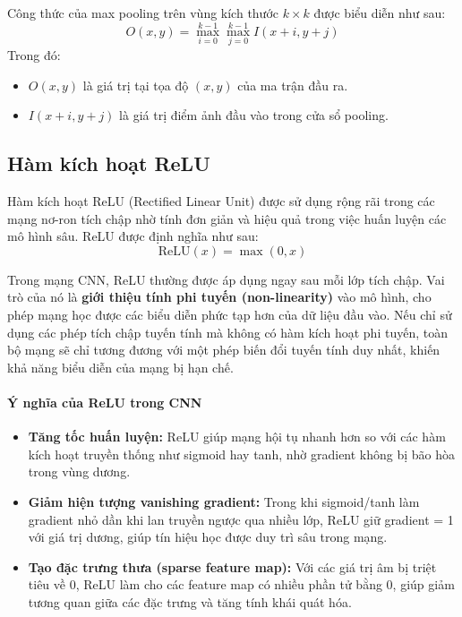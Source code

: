 Công thức của max pooling trên vùng kích thước \( k \times k \) được biểu diễn như sau:\\
\[
O(x, y) = \max_{i=0}^{k-1} \max_{j=0}^{k-1} I(x+i, y+j)
\]
Trong đó:
\begin{itemize}
    \item $O(x, y)$ là giá trị tại tọa độ $(x, y)$ của ma trận đầu ra.
    \item $I(x+i, y+j)$ là giá trị điểm ảnh đầu vào trong cửa sổ pooling.
\end{itemize}

\subsection{Hàm kích hoạt ReLU}

Hàm kích hoạt ReLU (Rectified Linear Unit) được sử dụng rộng rãi trong các mạng nơ-ron tích chập nhờ tính đơn giản và hiệu quả trong việc huấn luyện các mô hình sâu. ReLU được định nghĩa như sau:
\[
\mathrm{ReLU}(x) = \max(0, x)
\]

Trong mạng CNN, ReLU thường được áp dụng ngay sau mỗi lớp tích chập. Vai trò của nó là \textbf{giới thiệu tính phi tuyến (non-linearity)} vào mô hình, cho phép mạng học được các biểu diễn phức tạp hơn của dữ liệu đầu vào. Nếu chỉ sử dụng các phép tích chập tuyến tính mà không có hàm kích hoạt phi tuyến, toàn bộ mạng sẽ chỉ tương đương với một phép biến đổi tuyến tính duy nhất, khiến khả năng biểu diễn của mạng bị hạn chế.

\paragraph{Ý nghĩa của ReLU trong CNN}
\begin{itemize}
  \item \textbf{Tăng tốc huấn luyện:} ReLU giúp mạng hội tụ nhanh hơn so với các hàm kích hoạt truyền thống như sigmoid hay tanh, nhờ gradient không bị bão hòa trong vùng dương.
  \item \textbf{Giảm hiện tượng vanishing gradient:} Trong khi sigmoid/tanh làm gradient nhỏ dần khi lan truyền ngược qua nhiều lớp, ReLU giữ gradient = 1 với giá trị dương, giúp tín hiệu học được duy trì sâu trong mạng.
  \item \textbf{Tạo đặc trưng thưa (sparse feature map):} Với các giá trị âm bị triệt tiêu về 0, ReLU làm cho các feature map có nhiều phần tử bằng 0, giúp giảm tương quan giữa các đặc trưng và tăng tính khái quát hóa.
\end{itemize}

